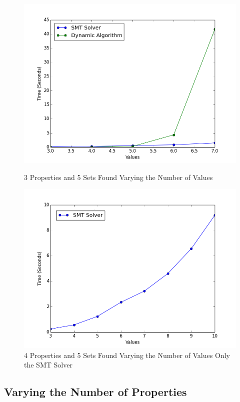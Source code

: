 \documentclass[pageno]{jpaper}
\begin{document}
\begin{figure}[htbb]
\begin{minipage}[b]{0.5\linewidth}
\centering
\includegraphics[width=.75\linewidth]{DvSVAL-v34567p3n5.png}
\caption{3 Properties and 5 Sets Found Varying the Number of Values}
\label{fig:DvSVAL}
\end{minipage}
\hspace{0.5cm}
\begin{minipage}[b]{0.5\linewidth}
\centering
\includegraphics[width=.75\linewidth]{SMTOnlyVAL-v345678910p4n5.png}
\caption{4 Properties and 5 Sets Found Varying the Number of Values Only the SMT Solver}
\label{fig:SMTVal}
\end{minipage}
\end{figure}








\subsection{Varying the Number of Properties}
\end{document}
